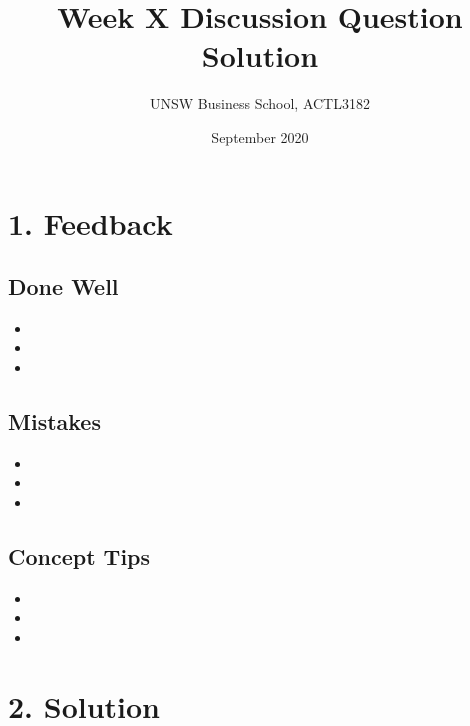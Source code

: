 \documentclass[11pt]{article}
\title{\textbf{Week X Discussion Question Solution}}
\author{UNSW Business School, ACTL3182}
\date{September 2020}
\begin{document}
	\maketitle
	
	\section*{1. Feedback}
		\subsection*{Done Well}
			\begin{itemize}
				\item 
				\item
				\item 
			\end{itemize}
		\subsection*{Mistakes}
			\begin{itemize}
				\item 
				\item
				\item 
			\end{itemize}
		\subsection*{Concept Tips}
			\begin{itemize}
				\item 
				\item
				\item 
			\end{itemize}
	\section*{2. Solution}
	
	
\end{document}
